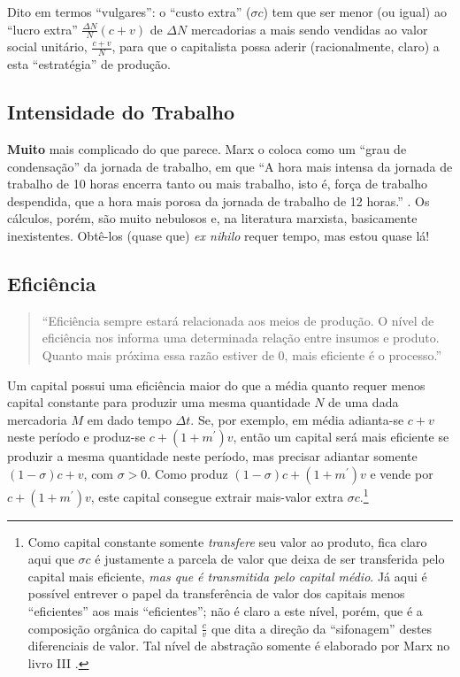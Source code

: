 Dito em termos ``vulgares'': o ``custo extra'' (\(\sigma c\)) tem que ser menor (ou igual) ao ``lucro extra'' \(\frac{\Delta N}{N}(c+v)\) de \(\Delta N\) mercadorias a mais sendo vendidas ao valor social unitário, \(\frac{c+v}{N}\), para que o capitalista possa aderir (racionalmente, claro) a esta ``estratégia'' de produção. 

\hypertarget{intensidade-do-trabalho}{%
\subsection{Intensidade do Trabalho}\label{intensidade-do-trabalho}}
\textbf{Muito} mais complicado do que parece. Marx o coloca como um ``grau de condensação'' da jornada de trabalho, em que ``A hora mais intensa da jornada de trabalho de 10 horas encerra tanto ou mais trabalho, isto é, força de trabalho despendida, que a hora mais porosa da jornada de trabalho de 12 horas.'' \parencite[p. 482-3]{Marx2017}. Os cálculos, porém, são muito nebulosos e, na literatura marxista, basicamente inexistentes. Obtê-los (quase que) \textit{ex nihilo} requer tempo, mas estou quase lá!


\hypertarget{eficiuxeancia}{%
\subsection{Eficiência}\label{eficiuxeancia}}

\begin{quote}
``Eficiência sempre estará relacionada aos meios de produção. O nível de eficiência nos informa uma determinada relação entre insumos e produto. Quanto mais próxima essa razão estiver de \(0\), mais eficiente é o processo.'' \parencite[, p. 60]{SaBarreto2022}
\end{quote}

Um capital possui uma eficiência maior do que a média quanto requer menos capital constante para produzir uma mesma quantidade \(N\) de uma dada mercadoria \(M\) em dado tempo \(\Delta t\). Se, por exemplo, em média adianta-se \(c+v\) neste período e produz-se \(c+(1+m^{\prime})v\), então um capital será mais eficiente se produzir a mesma quantidade neste período, mas precisar adiantar somente \((1-\sigma)c + v\), com \(\sigma>0\). Como produz \((1-\sigma)c + (1+m^{\prime})v\) e vende por \(c+(1+m^{\prime})v\), este capital consegue extrair mais-valor extra \(\sigma c\).\footnote{Como capital constante somente \textit{transfere} seu valor ao produto, fica claro aqui que \(\sigma c\) é justamente a parcela de valor que deixa de ser transferida pelo capital mais eficiente, \textit{mas que é transmitida pelo capital médio}. Já aqui é possível entrever o papel da transferência de valor dos capitais menos ``eficientes'' aos mais ``eficientes''; não é claro a este nível, porém, que é a composição orgânica do capital \(\frac{c}{v}\) que dita a direção da ``sifonagem'' destes diferenciais de valor. Tal nível de abstração somente é elaborado por Marx no livro III \parencite{Marx2017a}.}

